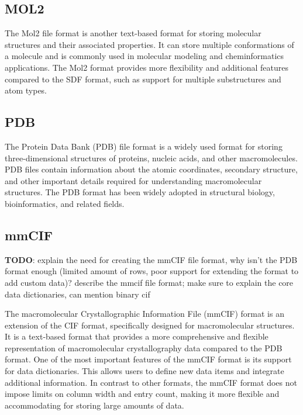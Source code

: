 \documentclass[
  digital,     %
  oneside,     %
  nosansbold,  %
  nocolorbold, %
  lof,         %
  lot,         %
]{fithesis4}
\begin{document}
\subsection{MOL2}
\label{subsection:mol2}

The Mol2 file format is another text-based format for storing molecular structures and their associated properties. It can store multiple conformations of a molecule and is commonly used in molecular modeling and cheminformatics applications. The Mol2 format provides more flexibility and additional features compared to the SDF format, such as support for multiple substructures and atom types.

\subsection{PDB}
\label{subsection:pdb}

\cite{gu2009structural}

The Protein Data Bank (PDB) file format is a widely used format for storing three-dimensional structures of proteins, nucleic acids, and other macromolecules. PDB files contain information about the atomic coordinates, secondary structure, and other important details required for understanding macromolecular structures. The PDB format has been widely adopted in structural biology, bioinformatics, and related fields.

\subsection{mmCIF}
\label{subsection:mmcif}

\textbf{TODO}: explain the need for creating the mmCIF file format, why isn't the PDB format enough (limited amount of rows, poor support for extending the format to add custom data)? describe the mmcif file format; make sure to explain the core data dictionaries, can mention binary cif \\

\cite{gu2009structural}

The macromolecular Crystallographic Information File (mmCIF) format is an extension of the CIF format, specifically designed for macromolecular structures.
It is a text-based format that provides a more comprehensive and flexible representation of macromolecular crystallography data compared to the PDB format.
One of the most important features of the mmCIF format is its support for data dictionaries.
This allows users to define new data items and integrate additional information.
In contrast to other formats, the mmCIF format does not impose limits on column width and entry count, making it more flexible and accommodating for storing large amounts of data.
\end{document}
